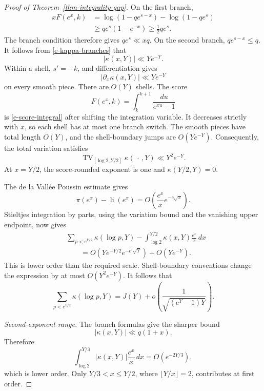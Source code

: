 \begin{proof}[Proof of Theorem~\ref{thm-integrality-gap}]
On the first branch,
\[
\begin{aligned}
    xF(e^x,k)
    &=
    \log(1-qe^{s-x})-\log(1-qe^s)\\
    &\geq
    qe^s(1-e^{-x})
    \geq
    \tfrac12qe^s.
\end{aligned}
\]
The branch condition therefore gives \(qe^s\ll xq\). On the second
branch, \(qe^{s-x}\leq q\). It follows from
\eqref{e-kappa-branches} that
\[
    |\kappa(x,Y)|\ll Y e^{-Y}.
\]
Within a shell, \(s'=-k\), and differentiation gives
\[
    |\partial_x\kappa(x,Y)|\ll Y e^{-Y}
\]
on every smooth piece. There are \(O(Y)\) shells. The score
\[
    F(e^x,k)=\int_k^{k+1}\frac{du}{e^{xu}-1}
\]
is \eqref{e-score-integral} after shifting the integration variable. It
decreases strictly with \(x\), so each shell has at most one branch
switch. The smooth pieces have total length \(O(Y)\), and the
shell-boundary jumps are \(O(Ye^{-Y})\). Consequently, the total
variation satisfies
\[
    \operatorname{TV}_{[\log2,Y/2]}
    \kappa(\,\cdot\,,Y)
    \ll
    Y^2e^{-Y}.
\]
At \(x=Y/2\), the score-rounded exponent is one and
\(\kappa(Y/2,Y)=0\).

The de la Vall\'ee Poussin estimate \cite{delavalleepoussin1899} gives
\[
    \pi(e^x)-\operatorname{li}(e^x)
    =
    O\left(
        \frac{e^x}{x}e^{-c\sqrt x}
    \right).
\]
Stieltjes integration by parts, using the variation bound and the
vanishing upper endpoint, now gives
\[
\begin{aligned}
    &\sum_{p<e^{Y/2}}\kappa(\log p,Y)
    -
    \int_{\log2}^{Y/2}\kappa(x,Y)\frac{e^x}{x}\,dx\\
    &\qquad
    =
    O\left(
        Ye^{-Y/2}e^{-c'\sqrt Y}
    \right)
    +O(Ye^{-Y}).
\end{aligned}
\]
This is lower order than the required scale. Shell-boundary conventions
change the expression by at most \(O(Y^2e^{-Y})\).
It follows that
\[
    \sum_{p<e^{Y/2}}\kappa(\log p,Y)
    =
    J(Y)
    +
    o\left(\frac1{\sqrt{(e^Y-1)Y}}\right).
\]

\medskip\noindent\emph{Second-exponent range.}
The branch formulas give the sharper bound
\[
    |\kappa(x,Y)|\ll q(1+x).
\]
Therefore
\[
    \int_{\log2}^{Y/3}
    |\kappa(x,Y)|\frac{e^x}{x}\,dx
    =
    O(e^{-2Y/3}),
\]
which is lower order. Only \(Y/3<x\leq Y/2\), where
\(\lfloor Y/x\rfloor=2\), contributes at first order.


\end{proof}
